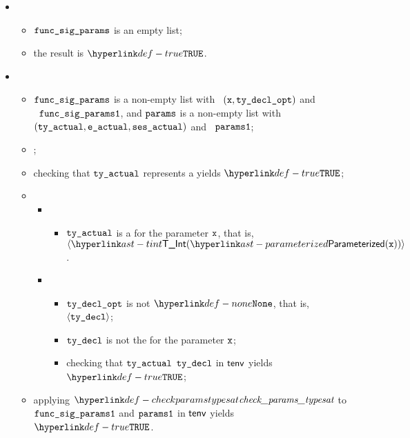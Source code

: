 \ProseParagraph
\OneApplies
\begin{itemize}
  \item {}
  \begin{itemize}
    \item $\texttt{func\_sig\_params}$ is an empty list;
    \item the result is $\True$.
  \end{itemize}

  \item \AllApply
  \begin{itemize}
    \item $\texttt{func\_sig\_params}$ is a non-empty list with \head\ $(\texttt{x}, \texttt{ty\_decl\_opt})$ and \\
          \tail\ $\texttt{func\_sig\_params1}$, and
          $\texttt{params}$ is a non-empty list with \head\ \\
          $(\texttt{ty\_actual}, \texttt{e\_actual}, \texttt{ses\_actual})$ and \tail\ $\texttt{params1}$;
    \item \Prosechecksymbolicallyevaluable{$\vsesactual$};
    \item checking that $\texttt{ty\_actual}$ represents a \constrainedinteger{} yields $\True$\ProseOrTypeError;
    \item \OneApplies
    \begin{itemize}
      \item {}
      \begin{itemize}
        \item $\texttt{ty\_actual}$ is a \parameterizedintegertype{} for the parameter $\texttt{x}$, that is, \\
              $\langle\TInt(\parameterized(\vx))\rangle$.
      \end{itemize}

      \item {}
      \begin{itemize}
        \item $\texttt{ty\_decl\_opt}$ is not $\None$, that is, $\langle\texttt{ty\_decl}\rangle$;
        \item $\texttt{ty\_decl}$ is not the \parameterizedintegertype{} for the parameter $\texttt{x}$;
        \item checking that $\texttt{ty\_actual}$ \typesatisfies{} $\texttt{ty\_decl}$ in $\textsf{tenv}$ yields
              $\True$\ProseOrTypeError;
      \end{itemize}
    \end{itemize}
    \item applying $\checkparamstypesat$ to $\texttt{func\_sig\_params1}$ and $\texttt{params1}$ in $\textsf{tenv}$
          yields \\ $\True$\ProseOrTypeError.
  \end{itemize}
\end{itemize}

